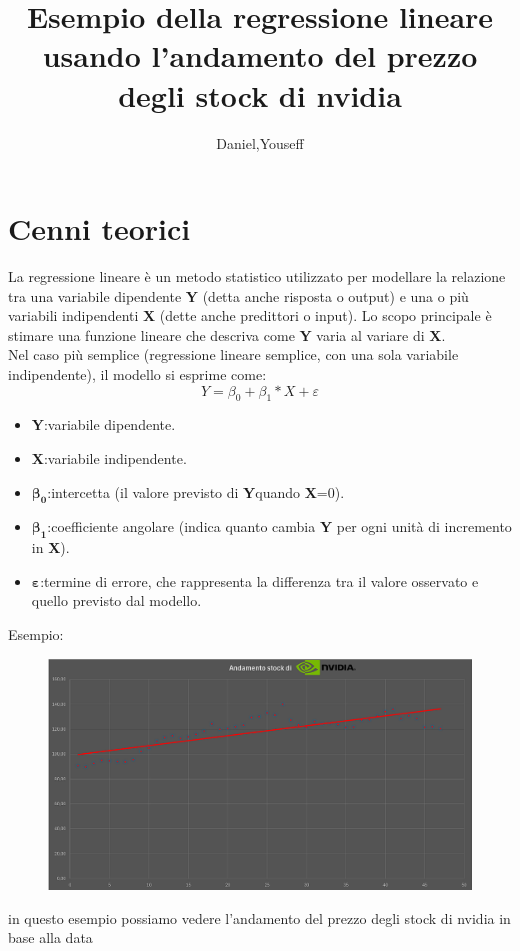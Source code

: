 \documentclass[12pt]{article}
\author{Daniel,Youseff}
\title{Esempio della regressione lineare usando l'andamento del prezzo degli stock di nvidia}
\begin{document}
\maketitle
\section*{Cenni teorici}
La regressione lineare è un metodo statistico utilizzato per modellare la relazione tra una variabile dipendente
\textbf{Y} (detta anche risposta o output) e una o più variabili indipendenti 
\textbf{X} (dette anche predittori o input). Lo scopo principale è stimare una funzione lineare che descriva come \textbf{Y} 
varia al variare di \textbf{X}.
\\Nel caso più semplice (regressione lineare semplice, con una sola variabile indipendente), il modello si esprime come:
\begin{equation}
    Y=\beta_0+\beta_1*X+\varepsilon  
\end{equation}
\begin{itemize}
    \item \textbf{Y}:variabile dipendente.
    \item \textbf{X}:variabile indipendente.
    \item \begin{math}\mathbf{\beta_0}\end{math}:intercetta (il valore previsto di \textbf{Y}quando \textbf{X}=0).
    \item \begin{math} \mathbf{\beta_1}\end{math}:coefficiente angolare (indica quanto cambia \textbf{Y} per ogni unità
          di incremento in \textbf{X}).
    \item \begin{math}\mathbf{\varepsilon}\end{math}:termine di errore, che rappresenta la differenza
          tra il valore osservato e quello previsto dal modello.       
\end{itemize}
\newpage
\begin{center}
    Esempio:

\begin{figure}[ht]
    \centering
    \includegraphics[width=\textwidth]{immagini/Screenshot 2024-11-20 000800.png}
\end{figure}
in questo esempio possiamo vedere l'andamento del prezzo degli stock di nvidia in base alla data
\end{center}
\end{document}
